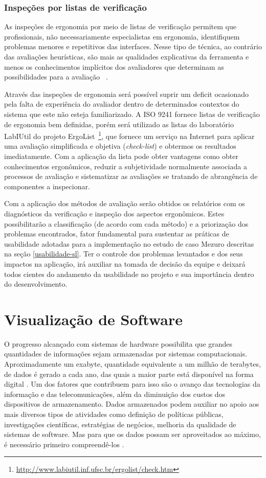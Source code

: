 \subsubsection{Inspeções por listas de verificação}
\label{inspeções-listas}
As inspeções de ergonomia por meio de listas de verificação permitem que
profissionais, não necessariamente especialistas em ergonomia, identifiquem
problemas menores e repetitivos das interfaces.
%
Nesse tipo de técnica, ao contrário das avaliações heurísticas, são mais as
qualidades explicativas da ferramenta e menos os conhecimentos implícitos dos
avaliadores que determinam as possibilidades para a avaliação ~\cite{cybis2010}.

%
Através das inspeções de ergonomia será possível suprir um deficit ocasionado
pela falta de experiência do avaliador dentro de determinados contextos do
sistema que este não esteja familiarizado.
%
A ISO 9241 fornece listas de verificação de ergonomia bem definidas, porém será
utilizado as listas do laboratório LabIUtil do projeto
ErgoList~\footnote{\url{http://www.labiutil.inf.ufsc.br/ergolist/check.htm}},
que fornece um serviço na Internet para aplicar uma avaliação
simplificada e objetiva (\textit{check-list}) e obtermos os resultados
imediatamente.
%
Com a aplicação da lista pode obter vantagens como obter conhecimentos
ergonômicos, reduzir a subjetividade normalmente associada a processos de
avaliação e sistematizar as avaliações se tratando de abrangência de componentes
a inspecionar.

Com a aplicação dos métodos de avaliação serão obtidos os relatórios com os diagnósticos da verificação e inspeção dos aspectos ergonômicos. Estes possibilitarão a classificação (de acordo com cada método) e a priorização dos problemas encontrados, fator fundamental para sustentar as práticas de usabilidade adotadas para a implementação no estudo de caso Mezuro descritas na seção \ref{usabilidade-sl}. Ter o controle dos problemas levantados e dos seus impactos na aplicação, irá auxiliar na tomada de decisão da equipe e deixará todos cientes do andamento da usabilidade no projeto e sua importância dentro do desenvolvimento. 

\section{Visualização de Software}
\label{sec-visualizacao}
O progresso alcançado com sistemas de hardware possibilita que grandes quantidades de informações sejam armazenadas por sistemas computacionais. Aproximadamente um exabyte, quantidade equivalente a um milhão de terabytes, de dados é gerado a cada ano, das quais a maior parte está disponível na forma digital \cite{keim2002information}. Um dos fatores que contribuem para isso são o avanço das tecnologias da informação e das telecomunicações, além da diminuição dos custos dos dispositivos de armazenamento. Dados armazenados podem auxiliar no apoio aos mais diversos tipos de atividades como definição de políticas públicas, investigações científicas, estratégias de negócios, melhoria da qualidade de sistemas de software. Mas para que os dados possam ser aproveitados ao máximo, é necessário primeiro compreendê-los \cite{heer2012interactive}.

